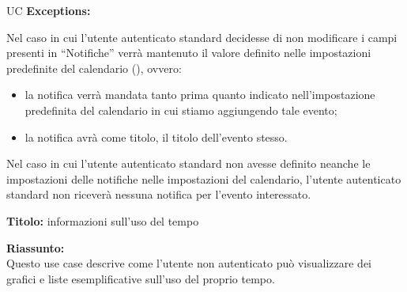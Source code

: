\begin{listaPersonale}{UC}
    \textbf{Exceptions:}
    \begin{enumerate}[label=\textbf{[exception \arabic{enumii}]}, ref= \textbf{[exception \arabic{enumii}]}]
         Nel caso in cui l'utente autenticato standard decidesse di non modificare i campi presenti in “Notifiche” verrà mantenuto il valore definito nelle impostazioni predefinite del calendario (), ovvero:
        \begin{itemize}
            \item la notifica verrà mandata tanto prima quanto indicato nell'impostazione predefinita del calendario in cui stiamo aggiungendo tale evento;
            \item la notifica avrà come titolo, il titolo dell'evento stesso.
        \end{itemize}
         Nel caso in cui l'utente autenticato standard non avesse definito neanche le impostazioni delle notifiche nelle impostazioni del calendario, l'utente autenticato standard non riceverà nessuna notifica per l'evento interessato.
    \end{enumerate}









    \newpage


    \begin{center}
        
    \end{center}

    \textbf{Titolo:} informazioni sull'uso del tempo

    \textbf{Riassunto:} \\
    Questo use case descrive come l'utente non autenticato può visualizzare dei grafici e liste esemplificative sull'uso del proprio tempo.


\end{listaPersonale}
